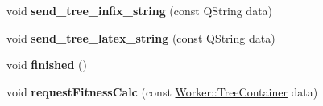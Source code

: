 \begin{DoxyCompactItemize}
\item 
\hypertarget{classWorker_aadcaa7cdf5c014611db00b7e000868e5}{}void {\bfseries send\+\_\+tree\+\_\+infix\+\_\+string} (const Q\+String data)\label{classWorker_aadcaa7cdf5c014611db00b7e000868e5}

\item 
\hypertarget{classWorker_ae1dced9d9b9572d03d284a13638df49b}{}void {\bfseries send\+\_\+tree\+\_\+latex\+\_\+string} (const Q\+String data)\label{classWorker_ae1dced9d9b9572d03d284a13638df49b}

\item 
\hypertarget{classWorker_adfa119799838e68b671be5947a367f4a}{}void {\bfseries finished} ()\label{classWorker_adfa119799838e68b671be5947a367f4a}

\item 
\hypertarget{classWorker_a4cde48b2f055eb1f13546433a472a0d5}{}void {\bfseries request\+Fitness\+Calc} (const \hyperlink{structWorker_1_1TreeContainer}{Worker\+::\+Tree\+Container} data)\label{classWorker_a4cde48b2f055eb1f13546433a472a0d5}

\end{DoxyCompactItemize}
